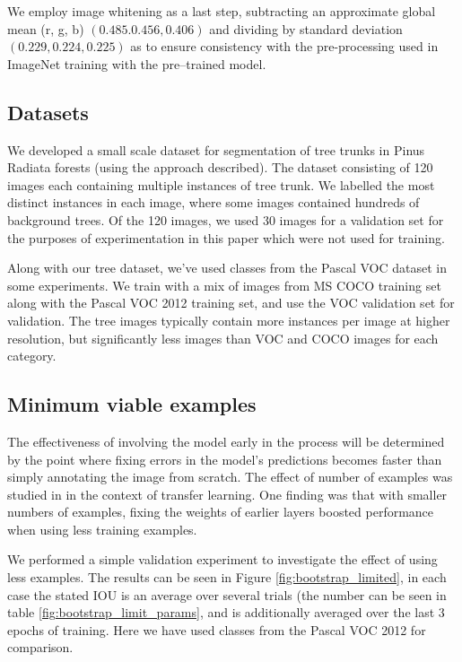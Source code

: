 We employ image whitening as a last step, subtracting an approximate global mean (r, g, b) $ (0.485. 0.456, 0.406) $ and dividing by standard deviation $ (0.229, 0.224, 0.225) $ as to ensure consistency with the pre-processing used in ImageNet training with the pre--trained model.



\subsection {Datasets}




We developed a small scale dataset for segmentation of tree trunks in Pinus Radiata forests (using the approach described). The dataset consisting of 120 images each containing multiple instances of tree trunk. We labelled the most distinct instances in each image, where some images contained hundreds of background trees. Of the 120 images, we used 30 images for a validation set for the purposes of experimentation in this paper which were not used for training.

Along with our tree dataset, we've used classes from the Pascal VOC dataset in some experiments. We train with a mix of images from MS COCO \cite{Lin2014} training set along with the Pascal VOC 2012 training set, and use the VOC validation set for validation. The tree images typically contain more instances per image at higher resolution, but significantly less images than VOC and COCO images for each category.


\subsection {Minimum viable examples}

The effectiveness of involving the model early in the process will be determined by the point where fixing errors in the model's predictions becomes faster than simply annotating the image from scratch. The effect of number of examples was studied in \cite{Soekhoe} in the context of transfer learning. One finding was that with smaller numbers of examples, fixing the weights of earlier layers boosted performance when using less training examples.

We performed a simple validation experiment to investigate the effect of using less examples. The results can be seen in Figure \ref{fig:bootstrap_limited}, in each case the stated IOU is an average over several trials (the number can be seen in table \ref{fig:bootstrap_limit_params}, and is additionally averaged over the last 3 epochs of training. Here we have used classes from the Pascal VOC 2012 for comparison.

